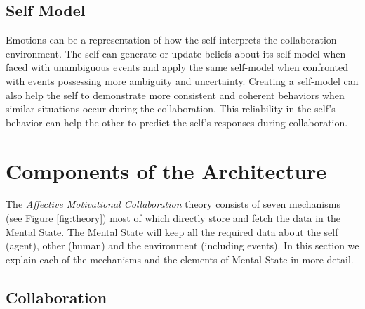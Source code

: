 \documentclass[12pt]{report}
\begin{document}
\subsection{Self Model} Emotions can be a representation of how the self
interprets the collaboration environment. The self can generate or update
beliefs about its self-model when faced with unambiguous events and apply the
same self-model when confronted with events possessing more ambiguity and
uncertainty. Creating a self-model can also help the self to demonstrate more
consistent and coherent behaviors when similar situations occur during the
collaboration. This reliability in the self's behavior can help the other to
predict the self's responses during collaboration.

\section{Components of the Architecture}
\label{sec:architecture-components}

The \textit{Affective Motivational Collaboration} theory consists of seven
mechanisms (see Figure \ref{fig:theory}) most of which directly store and fetch
the data in the Mental State. The Mental State will keep all the required data
about the self (agent), other (human) and the environment (including events). In
this section we explain each of the mechanisms and the elements of Mental State
in more detail.

\subsection{Collaboration}
\end{document}
